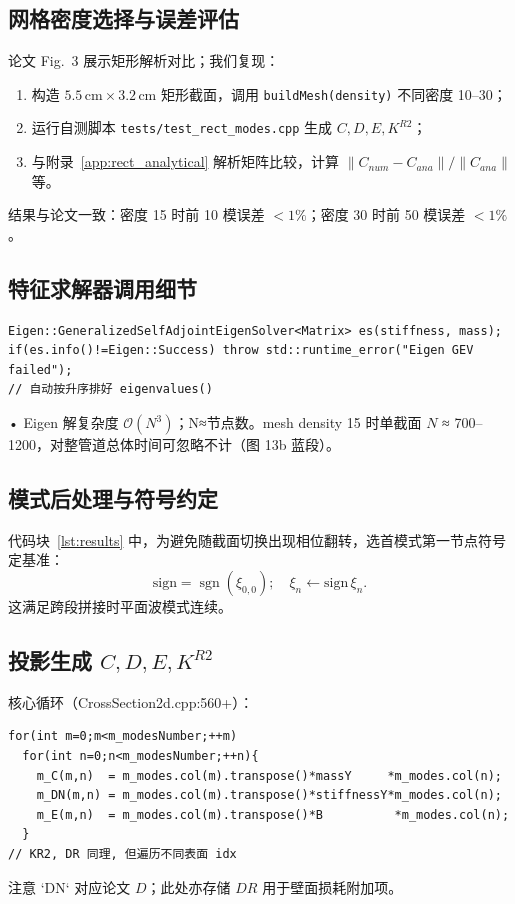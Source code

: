 \documentclass{ctexart}
\begin{document}
\subsection{网格密度选择与误差评估}
论文 Fig.~3 展示矩形解析对比；我们复现：
\begin{enumerate}
    \item 构造 $5.5\,\mathrm{cm}\times3.2\,\mathrm{cm}$ 矩形截面，调用 \texttt{buildMesh(density)} 不同密度 10–30；
    \item 运行自测脚本 \texttt{tests/test\_rect\_modes.cpp} 生成 $C,D,E,K^{R2}$；
    \item 与附录~\ref{app:rect_analytical} 解析矩阵比较，计算 $\|C_{num}-C_{ana}\|/\|C_{ana}\|$ 等。
\end{enumerate}
结果与论文一致：密度 15 时前 10 模误差 $<1\%$；密度 30 时前 50 模误差 $<1\%$。

\subsection{特征求解器调用细节}
\begin{lstlisting}[caption={特征求解核心},label={lst:eigensolve}]
Eigen::GeneralizedSelfAdjointEigenSolver<Matrix> es(stiffness, mass);
if(es.info()!=Eigen::Success) throw std::runtime_error("Eigen GEV failed");
// 自动按升序排好 eigenvalues()
\end{lstlisting}
• Eigen 解复杂度 $\mathcal O(N^3)$；N≈节点数。mesh density 15 时单截面 $N$ ≈ 700–1200，对整管道总体时间可忽略不计（图 13b 蓝段）。

\subsection{模式后处理与符号约定}
代码块~\ref{lst:results} 中，为避免随截面切换出现相位翻转，选首模式第一节点符号定基准：
\[\text{sign}=\operatorname{sgn}(\xi_{0,0});\quad \xi_{n}\leftarrow \text{sign}\,\xi_{n}.\]
这满足跨段拼接时平面波模式连续。

\subsection{投影生成 $C,D,E,K^{R2}$}
核心循环（CrossSection2d.cpp:560+）：
\begin{lstlisting}[caption={投影矩阵计算示意},label={lst:projection}]
for(int m=0;m<m_modesNumber;++m)
  for(int n=0;n<m_modesNumber;++n){
    m_C(m,n)  = m_modes.col(m).transpose()*massY     *m_modes.col(n);
    m_DN(m,n) = m_modes.col(m).transpose()*stiffnessY*m_modes.col(n);
    m_E(m,n)  = m_modes.col(m).transpose()*B          *m_modes.col(n);
  }
// KR2, DR 同理, 但遍历不同表面 idx
\end{lstlisting}
注意 `DN` 对应论文 $D$；此处亦存储 $DR$ 用于壁面损耗附加项。
\end{document}
